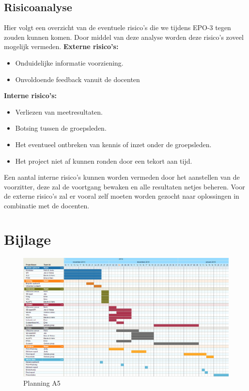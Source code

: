 \documentclass[oneside,dutch]{tudelft-report}
\begin{document}
\subsection{Risicoanalyse}
Hier volgt een overzicht van de eventuele risico's die we tijdens EPO-3 tegen zouden kunnen komen. Door middel van deze analyse worden deze risico's zoveel mogelijk vermeden.
\textbf{Externe risico's:}
\begin{itemize}
\item Onduidelijke informatie voorziening.
\item Onvoldoende feedback vanuit de docenten
\end{itemize}
\textbf{Interne risico's:}
\begin{itemize}
\item Verliezen van meetresultaten.
\item Botsing tussen de groepsleden.
\item Het eventueel ontbreken van kennis of inzet onder de groepsleden.
\item Het project niet af kunnen ronden door een tekort aan tijd.
\end{itemize}
Een aantal interne risico's kunnen worden vermeden door het aanstellen van de voorzitter, deze zal de voortgang bewaken en alle resultaten netjes beheren. Voor de externe risico's zal er vooral zelf moeten worden gezocht naar oplossingen in combinatie met de docenten.

\newpage
\section{Bijlage}
\begin{figure}[h]
  \centering
  \includegraphics[width=15.5cm,  angle=-90]{Planning}
    \caption{Planning A5} 
\end{figure}
\end{document}
